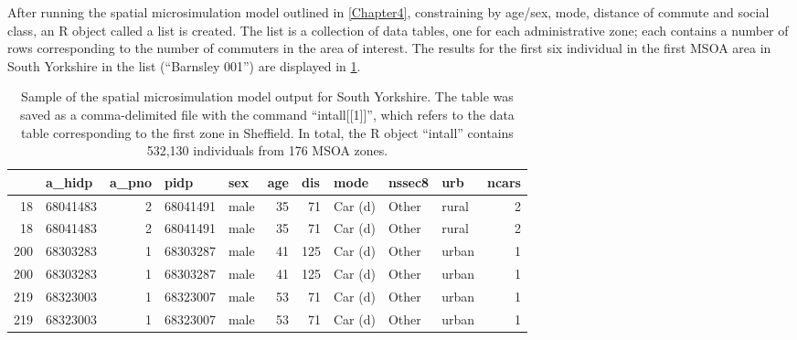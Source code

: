After running the spatial microsimulation model outlined in
\cref{Chapter4}, constraining by age/sex, mode, distance of commute and
social class, an R object called a list is created. The list is a collection
of data tables, one for each administrative zone; each contains a number of
rows corresponding to the number of commuters in the area of interest.
The results for the first six individual in the first MSOA area
in South Yorkshire in the list (``Barnsley 001'') are displayed in
\cref{tintallh}.

\begin{table}[htbp]
\caption[Sample of the spatial microsimulation model output]
{Sample of the spatial microsimulation model output for South
Yorkshire. The table was saved as a comma-delimited file with the command
``intall[[1]]'', which refers to the data table corresponding to the
first zone in Sheffield. In total, the R object
``intall'' contains 532,130 individuals from 176 MSOA zones.}
\begin{tabular}{rrrrlrrlllr}
\toprule
\multicolumn{1}{l}{} & \multicolumn{1}{l}{a\_hidp} & \multicolumn{1}{l}{a\_pno} &
\multicolumn{1}{l}{pidp} & sex & \multicolumn{1}{l}{age} & \multicolumn{1}{l}{dis}
& mode & nssec8 & urb & \multicolumn{1}{l}{ncars} \\
\midrule
18 & 68041483 & 2 & 68041491 & male & 35 & 71 & Car (d) & Other & rural & 2 \\
18 & 68041483 & 2 & 68041491 & male & 35 & 71 & Car (d) & Other & rural & 2 \\
200 & 68303283 & 1 & 68303287 & male & 41 & 125 & Car (d) & Other & urban & 1 \\
200 & 68303283 & 1 & 68303287 & male & 41 & 125 & Car (d) & Other & urban & 1 \\
219 & 68323003 & 1 & 68323007 & male & 53 & 71 & Car (d) & Other & urban & 1 \\
219 & 68323003 & 1 & 68323007 & male & 53 & 71 & Car (d) & Other & urban & 1 \\
\bottomrule
\end{tabular}
\label{tintallh}
\end{table}

